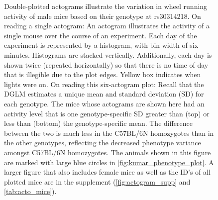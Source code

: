 \begin{figure}
        \caption[
            Double-plotted actograms illustrate the variation in wheel running activity of male mice based on their genotype at rs30314218.
        ]
        {
            Double-plotted actograms illustrate the variation in wheel running activity of male mice based on their genotype at rs30314218.
            On reading a single actogram:
            An actogram illustrates the activity of a single mouse over the course of an experiment.
            Each day of the experiment is represented by a histogram, with bin width of six minutes.
            Histograms are stacked vertically.
            Additionally, each day is shown twice (repeated horizontally) so that there is no time of day that is illegible due to the plot edges.
            Yellow box indicates when lights were on.
            On reading this six-actogram plot:
            Recall that the DGLM estimates a unique mean and standard deviation (SD) for each genotype.
            The mice whose actograms are shown here had an activity level that is one genotype-specific SD greater than (top) or less than (bottom) the genotype-specific mean.
            The difference between the two is much less in the C57BL/6N homozygotes than in the other genotypes, reflecting the decreased phenotype variance amongst C57BL/6N homozygotes.
            The animals shown in this figure are marked with large blue circles in \autoref{fig:kumar_phenotype_plot}.
            A larger figure that also includes female mice as well as the ID's of all plotted mice are in the supplement (\autoref{fig:actogram_supp} and \autoref{tab:acto_mice}).
        }
        \label{fig:actograms}
    \end{figure}


